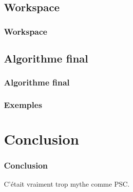 \documentclass[12pt, handout]{beamer}
\begin{document}
\subsection{Workspace}

\begin{frame}
 \frametitle{Workspace}
 
 
\end{frame}

\begin{frame}
 \frametitle{}
 
 
\end{frame}

\subsection{Algorithme final}

\begin{frame}
 \frametitle{Algorithme final}
 
 
\end{frame}

\begin{frame}
 \frametitle{Exemples}
 
 
\end{frame}

\section{Conclusion}

\begin{frame}
 \frametitle{Conclusion}
 
C'était vraiment trop mythe comme PSC\@.
 
\end{frame}
\end{document}
